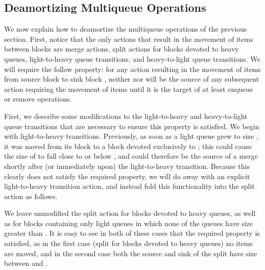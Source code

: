 \documentclass[11pt,letterpaper]{article}
\begin{document}
\subsection{Deamortizing Multiqueue Operations}
\label{sec:app}
We now explain how to deamortize the multiqueue operations of the previous section. First, notice that the only actions that result in the movement of items between blocks are merge actions, split actions for blocks devoted to heavy queues, light-to-heavy queue transitions, and heavy-to-light queue transitions. We will require the follow property: for any action resulting in the movement of items from source block  to sink block , neither  nor  will
be the source of any subsequent action requiring the movement of items until it is the target of at least  enqueue or remove operations.

First, we describe some modifications to the light-to-heavy and heavy-to-light queue transitions that are necessary to ensure this property is satisfied. We begin with light-to-heavy transitions. Previously, as soon as a light
queue  grew to size , it was moved from its block  to a block  devoted exclusively to ; this could cause the size of  to fall close to or below , and  could therefore be the source of a merge shortly after (or immediately upon) the light-to-heavy transition. Because this clearly does not satisfy the required property, we will do away with an explicit light-to-heavy transition action, and instead fold this functionality into the split action as follows. 

We leave unmodified the split action for blocks  devoted to heavy queues, as well as for blocks  containing only light queues in which none of the queues have size greater than . It is easy to see in both of these cases that the required property is satisfied, as in the first case (split for blocks devoted to heavy queues) no items are moved, and in the second case both the source and sink of the split have size between  and . 
\end{document}
